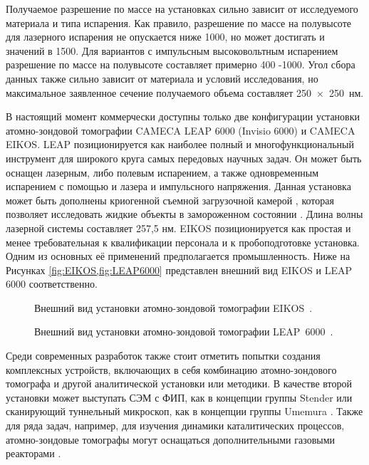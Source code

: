 Получаемое разрешение по массе на установках сильно зависит от исследуемого материала и типа испарения. Как правило, разрешение по массе на полувысоте для лазерного испарения не опускается ниже 1000, но может достигать и значений в 1500. Для вариантов с импульсным высоковольтным  испарением разрешение по массе на полувысоте составляет примерно 400 -1000. Угол сбора данных также сильно зависит от материала и условий исследования, но максимальное заявленное сечение получаемого объема составляет 250~×~250~нм.

В настоящий момент коммерчески доступны только две конфигурации установки атомно-зондовой томографии CAMECA LEAP 6000 (Invisio 6000) и CAMECA EIKOS. LEAP позиционируется как наиболее полный и многофункциональный инструмент для широкого круга самых передовых научных задач. Он может быть оснащен лазерным, либо полевым испарением, а также одновременным испарением с помощью и лазера и импульсного напряжения. Данная установка может быть дополнены криогенной съемной загрузочной камерой \cite{Stender20}, которая позволяет исследовать жидкие объекты в замороженном состоянии \cite{Schwarz20}. Длина волны лазерной системы составляет 257,5 нм. EIKOS  позиционируется как простая и менее требовательная к квалификации персонала и к пробоподготовке установка. Одним из основных её применений предполагается промышленность. Ниже на Рисунках \cref{fig:EIKOS,fig:LEAP6000} представлен внешний вид EIKOS и LEAP 6000 соответственно.

\begin{figure}[htb]
	\caption{Внешний вид установки атомно-зондовой томографии EIKOS~\cite{EIKOS}.}
	\label{fig:EIKOS}
\end{figure}

\begin{figure}[htb]
	\caption{Внешний вид установки атомно-зондовой томографии LEAP~6000~\cite{LEAP6000}.}
	\label{fig:LEAP6000}
\end{figure}

\FloatBarrier

Среди современных разработок также стоит отметить попытки создания комплексных устройств, включающих в себя комбинацию атомно-зондового томографа и другой аналитической установки или методики. В качестве второй установки может выступать СЭМ с ФИП, как в концепции группы Stender \cite{Stender22} или сканирующий туннельный микроскоп, как в концепции группы Umemura \cite{Umemura19}. Также для ряда задач, например, для изучения динамики каталитических процессов, атомно-зондовые томографы могут оснащаться дополнительными газовыми реакторами \cite{Lambeets20}.

